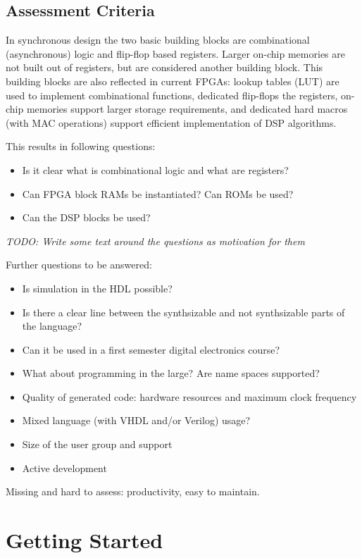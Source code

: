 \documentclass[10pt, technote, draftcls, onecolumn]{IEEEtran}
\newcommand{\todo}[1]{{\emph{TODO: #1}}}
\begin{document}
\subsection{Assessment Criteria}


In synchronous design the two basic building blocks are combinational
(asynchronous) logic and flip-flop based registers. Larger on-chip
memories are not built out of registers, but are considered another building
block. This building blocks are also reflected in current FPGAs: lookup tables
(LUT) are used to implement combinational functions, dedicated flip-flops
the registers, on-chip memories support larger storage requirements,
and dedicated hard macros (with MAC operations) support efficient
implementation of DSP algorithms.

This results in following questions:
\begin{itemize}
\item Is it clear what is combinational logic and what are registers?
\item Can FPGA block RAMs be instantiated? Can ROMs be used?
\item Can the DSP blocks be used?
\end{itemize}

\todo{Write some text around the questions as motivation for them}

Further questions to be answered:

\begin{itemize}
\item Is simulation in the HDL possible?
\item Is there a clear line between the synthsizable  and not synthsizable parts of the language?
\item Can it be used in a first semester digital electronics course?
\item What about programming in the large? Are name spaces supported?
\item Quality of generated code: hardware resources and maximum clock frequency
\item Mixed language (with VHDL and/or Verilog) usage?
\item Size of the user group and support
\item Active development
\end{itemize}

Missing and hard to assess: productivity, easy to maintain.

\section{Getting Started}
\end{document}
